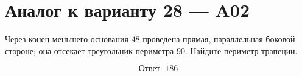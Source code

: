 


\section*{Аналог к варианту 28 — A02}
Через конец меньшего основания \(48\) проведена прямая, параллельная боковой стороне; она отсекает треугольник периметра \(90\). Найдите периметр трапеции.
\begin{center}\end{center}
\[\boxed{\text{Ответ: }186}\]

